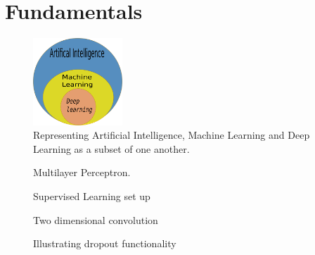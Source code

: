 \chapter{Fundamentals}

\begin{figure}[h]
    \begin{center}
        \includegraphics[width =0.3\textwidth]{figures/inkscape/aimldl.png}
    \end{center}
    \caption{Representing Artificial Intelligence, Machine Learning and Deep Learning as a
    subset of one another.}
    \label{fig:ai_ml_dl}
\end{figure}


\begin{figure}
	\centering
    
    \caption{Multilayer Perceptron.}
    \label{fig:multilayer_perceptron}
\end{figure}

\begin{figure}
	\centering
    
    \caption{Supervised Learning set up}
    \label{fig:SL_setup}
\end{figure}

\begin{figure}
	\centering
    
    \caption{Two dimensional convolution}
    \label{fig:2dconv}
\end{figure}

\begin{figure}
	\centering
    
    \caption{Illustrating dropout functionality}
    \label{fig:Dropout_function}
\end{figure}



